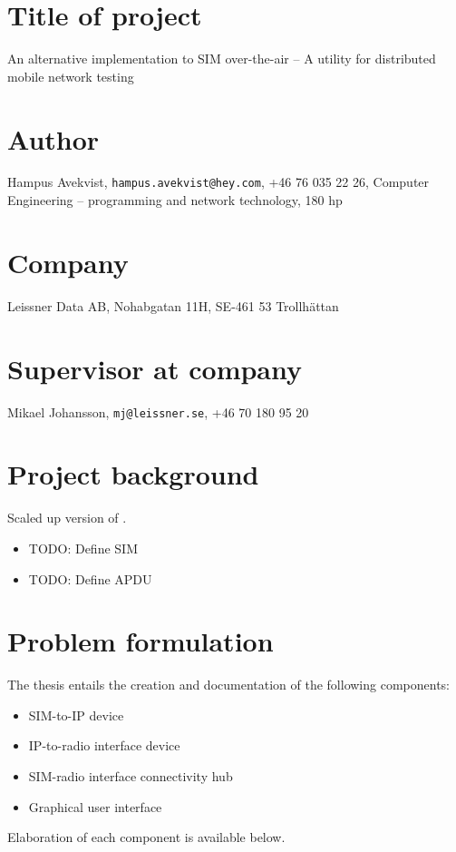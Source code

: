 \documentclass[12pt]{article}
\begin{document}
\thispagestyle{fancy}

\section*{Title of project}
An alternative implementation to SIM over-the-air -- A utility for distributed mobile network testing

\section*{Author}
Hampus Avekvist,\newline
\verb|hampus.avekvist@hey.com|,\newline
+46 76 035 22 26,\newline
Computer Engineering -- programming and network technology, 180 hp

\section*{Company}
Leissner Data AB,\newline
Nohabgatan 11H, SE-461 53 Trollhättan

\section*{Supervisor at company}
Mikael Johansson,\newline
\verb|mj@leissner.se|,\newline
+46 70 180 95 20

\section*{Project background}
Scaled up version of \cite{osmo-remsim}.

\begin{itemize}
    \item TODO: Define SIM
    \item TODO: Define APDU
\end{itemize}

\section*{Problem formulation}

The thesis entails the creation and documentation of the following
components:
\begin{itemize}
    \item SIM-to-IP device
    \item IP-to-radio interface device
    \item SIM-radio interface connectivity hub
    \item Graphical user interface
\end{itemize}
Elaboration of each component is available below.
\end{document}
